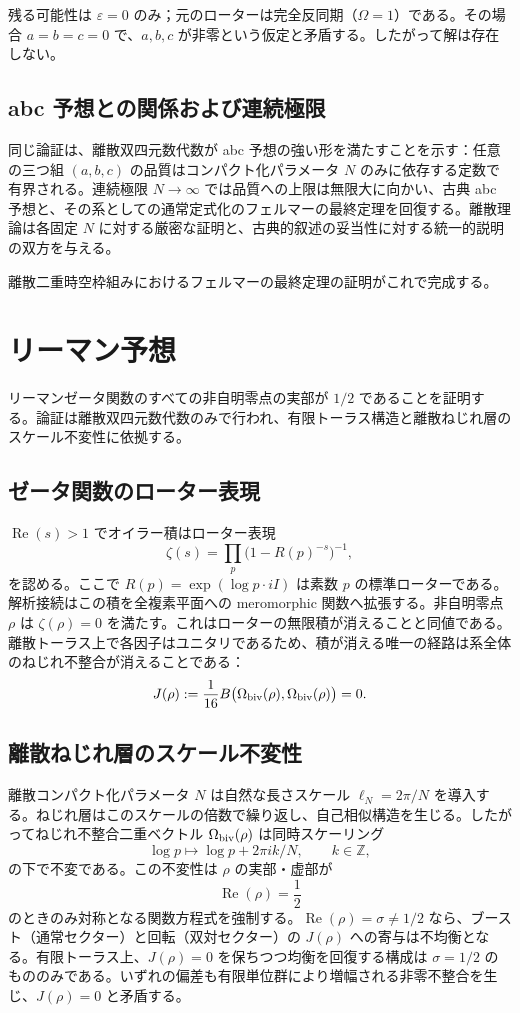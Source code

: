 \documentclass[a4paper]{article}
\theoremstyle{definition}
\begin{document}
残る可能性は $\varepsilon = 0$ のみ；元のローターは完全反同期（$\Omega = 1$）である。その場合 $a = b = c = 0$ で、$a, b, c$ が非零という仮定と矛盾する。したがって解は存在しない。

\subsection{abc 予想との関係および連続極限}

同じ論証は、離散双四元数代数が abc 予想の強い形を満たすことを示す：任意の三つ組 $(a,b,c)$ の品質はコンパクト化パラメータ $N$ のみに依存する定数で有界される。連続極限 $N \to \infty$ では品質への上限は無限大に向かい、古典 abc 予想と、その系としての通常定式化のフェルマーの最終定理を回復する。離散理論は各固定 $N$ に対する厳密な証明と、古典的叙述の妥当性に対する統一的説明の双方を与える。

離散二重時空枠組みにおけるフェルマーの最終定理の証明がこれで完成する。

\section{リーマン予想}

リーマンゼータ関数のすべての非自明零点の実部が $1/2$ であることを証明する。論証は離散双四元数代数のみで行われ、有限トーラス構造と離散ねじれ層のスケール不変性に依拠する。

\subsection{ゼータ関数のローター表現}

$\operatorname{Re}(s) > 1$ でオイラー積はローター表現
\[
\zeta(s) = \prod_p \bigl(1 - R(p)^{-s}\bigr)^{-1},
\]
を認める。ここで $R(p) = \exp(\log p \cdot iI)$ は素数 $p$ の標準ローターである。解析接続はこの積を全複素平面への meromorphic 関数へ拡張する。非自明零点 $\rho$ は $\zeta(\rho) = 0$ を満たす。これはローターの無限積が消えることと同値である。離散トーラス上で各因子はユニタリであるため、積が消える唯一の経路は系全体のねじれ不整合が消えることである：
\[
J(\rho) := \frac{1}{16} B\bigl(\Omega_{\rm biv}(\rho), \Omega_{\rm biv}(\rho)\bigr) = 0.
\]

\subsection{離散ねじれ層のスケール不変性}

離散コンパクト化パラメータ $N$ は自然な長さスケール $\ell_N = 2\pi / N$ を導入する。ねじれ層はこのスケールの倍数で繰り返し、自己相似構造を生じる。したがってねじれ不整合二重ベクトル $\Omega_{\rm biv}(\rho)$ は同時スケーリング
\[
\log p \mapsto \log p + 2\pi i k / N, \qquad k \in \mathbb{Z},
\]
の下で不変である。この不変性は $\rho$ の実部・虚部が
\[
\operatorname{Re}(\rho) = \frac12
\]
のときのみ対称となる関数方程式を強制する。$\operatorname{Re}(\rho) = \sigma \neq 1/2$ なら、ブースト（通常セクター）と回転（双対セクター）の $J(\rho)$ への寄与は不均衡となる。有限トーラス上、$J(\rho) = 0$ を保ちつつ均衡を回復する構成は $\sigma = 1/2$ のもののみである。いずれの偏差も有限単位群により増幅される非零不整合を生じ、$J(\rho) = 0$ と矛盾する。
\end{document}
